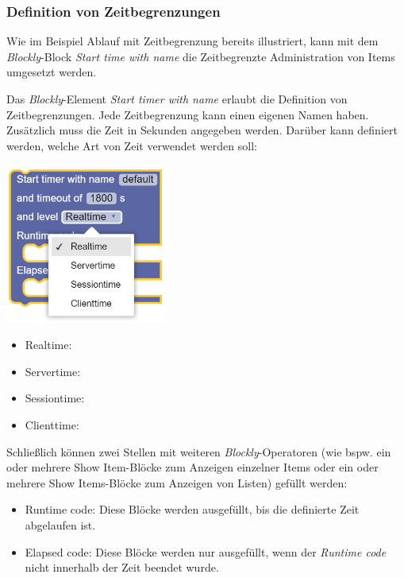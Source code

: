 \documentclass[
  letterpaper,
  DIV=11]{scrreprt}
\providecommand{\tightlist}{%
  \setlength{\itemsep}{0pt}\setlength{\parskip}{0pt}}\usepackage{longtable,booktabs,array}
\begin{document}
\begin{tcolorbox}
\hypertarget{definition-von-zeitbegrenzungen-1}{%
\subsubsection{Definition von
Zeitbegrenzungen}\label{definition-von-zeitbegrenzungen-1}}

Wie im Beispiel Ablauf mit Zeitbegrenzung bereits illustriert, kann mit
dem \emph{Blockly}-Block \emph{Start time with name} die Zeitbegrenzte
Administration von Items umgesetzt werden.

Das \emph{Blockly}-Element \emph{Start timer with name} erlaubt die
Definition von Zeitbegrenzungen. Jede Zeitbegrenzung kann einen eigenen
Namen haben. Zusätzlich muss die Zeit in Sekunden angegeben werden.
Darüber kann definiert werden, welche Art von Zeit verwendet werden
soll:

\includegraphics[width=2.08333in,height=\textheight]{img/screenshot-timer-component-time-level-example-ENG.png}

\begin{itemize}
\tightlist
\item
  Realtime:
\item
  Servertime:
\item
  Sessiontime:
\item
  Clienttime:
\end{itemize}

Schließlich können zwei Stellen mit weiteren \emph{Blockly}-Operatoren
(wie bspw. ein oder mehrere Show Item-Blöcke zum Anzeigen einzelner
Items oder ein oder mehrere Show Items-Blöcke zum Anzeigen von Listen)
gefüllt werden:

\begin{itemize}
\tightlist
\item
  Runtime code: Diese Blöcke werden ausgefüllt, bis die definierte Zeit
  abgelaufen ist.
\item
  Elapsed code: Diese Blöcke werden nur ausgefüllt, wenn der
  \emph{Runtime code} nicht innerhalb der Zeit beendet wurde.
\end{itemize}


\end{tcolorbox}
\end{document}
